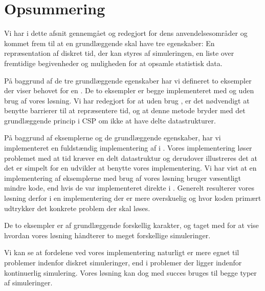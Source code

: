 \newpage\section{Opsummering}
Vi har i dette afsnit gennemgået \des og redegjort for dens anvendelsesområder og kommet frem til at en \des grundlæggende skal have tre egenskaber: En repræsentation af diskret tid, der kan styres af simuleringen, en liste over fremtidige begivenheder og muligheden for at opsamle statistisk data. 

På baggrund af de tre grundlæggende egenskaber har vi defineret to eksempler der viser behovet for en \des.
De to eksempler er begge implementeret med og uden brug af vores \des løsning. Vi har redegjort for at uden brug \des, er det nødvendigt at benytte barrierer til at repræsentere tid, og at denne metode bryder med det grundlæggende princip i CSP om ikke at have delte datastrukturer. 

På baggrund af eksemplerne og de grundlæggende egenskaber, har vi implementeret en fuldstændig implementering af \des i \pycsp.
Vores implementering løser problemet med at tid kræver en delt datastruktur og derudover illustreres det at det er simpelt for en udvikler at benytte vores implementering. 
 Vi har vist  at en implementering af eksemplerne med brug af vores løsning bruger væsentligt mindre kode, end hvis de var implementeret direkte i \pycsp. Generelt resulterer vores løsning derfor i en implementering der er mere overskuelig og hvor koden primært udtrykker det konkrete problem der skal løses. 

De to eksempler er af grundlæggende forskellig karakter, og taget med for at vise hvordan vores løsning håndterer to meget forskellige simuleringer. 

Vi kan se at fordelene ved vores \des implementering naturligt er mere egnet til problemer indenfor diskret simuleringer, end i problemer der ligger indenfor kontinuerlig simulering. Vores løsning kan dog med succes bruges til begge typer af simuleringer. 


